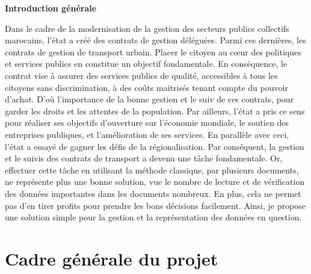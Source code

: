 \documentclass[a4paper]{report}
\begin{document}
\listoffigures
\newpage
{}
\begin{doublespace}
    \begin{center}
        \vspace*{1cm}
        \textbf{\huge{Introduction générale}}
    \end{center}
\end{doublespace}
\begin{doublespace}
    \renewcommand{\headrulewidth}{1pt}
    \fancyhead[L]{\hspace*{5cm}}
    Dans le cadre de la modernisation de la gestion des secteurs publics collectifs
    marocains, l’état a créé des contrats de gestion déléguées. Parmi ces dernières, les
    contrats de gestion de transport urbain. Placer le citoyen au cœur des politiques et
    services publics en constitue un objectif fondamentale. En conséquence, le contrat
    vise à assurer des services publics de qualité, accessibles à tous les
    citoyens sans discrimination, à des coûts maitrisés tenant compte du pouvoir
    d’achat. D'où  l'importance de la bonne gestion et le suiv de ces contrats, pour garder
    les droits et les attentes de la population.
    Par ailleurs, l’état a pris ce sens pour réaliser ses objectifs d’ouverture sur l’économie
    mondiale, le soutien des entreprises publiques, et l’amélioration de ses services.
    En parallèle avec ceci, l’état a essayé de gagner les défis de la régionalisation.
    Par conséquent, la gestion et le suivis des contrats de transport a devenu une tâche
    fondamentale. Or, effectuer cette tâche en utilisant la méthode classique, par plusieurs documents,
    ne représente plus une bonne solution, vue le nombre de lecture et de vérification
    des données importantes dans les documents nombreux. En plus, cela ne permet pas d’en
    tirer profits pour prendre les bons décisions facilement. Ainsi, je propose une
    solution simple pour la gestion et la représentation des données en question.
\end{doublespace}

\newpage

\chapter{Cadre générale du projet}
\end{document}
